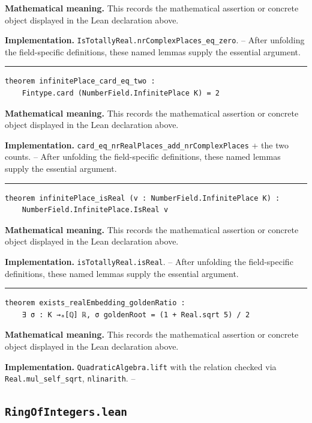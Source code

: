 \documentclass[UTF8,a4paper,11pt,fontset=fandol]{ctexart}
\theoremstyle{definition}
\newcommand{\statementsep}{\par\medskip\hrule\medskip}
\begin{document}
\noindent\textbf{Mathematical meaning.} This records the mathematical assertion or concrete object displayed in the Lean declaration above.\par
\noindent\textbf{Implementation.} \texttt{IsTotallyReal.\allowbreak{}nrComplexPlaces\_\allowbreak{}eq\_\allowbreak{}zero}. -- After unfolding the field-specific definitions, these named lemmas supply the essential argument.\par
\statementsep
\begin{verbatim}
theorem infinitePlace_card_eq_two :
    Fintype.card (NumberField.InfinitePlace K) = 2
\end{verbatim}
\noindent\textbf{Mathematical meaning.} This records the mathematical assertion or concrete object displayed in the Lean declaration above.\par
\noindent\textbf{Implementation.} \texttt{card\_\allowbreak{}eq\_\allowbreak{}nrRealPlaces\_\allowbreak{}add\_\allowbreak{}nrComplexPlaces} + the two counts. -- After unfolding the field-specific definitions, these named lemmas supply the essential argument.\par
\statementsep
\begin{verbatim}
theorem infinitePlace_isReal (v : NumberField.InfinitePlace K) :
    NumberField.InfinitePlace.IsReal v
\end{verbatim}
\noindent\textbf{Mathematical meaning.} This records the mathematical assertion or concrete object displayed in the Lean declaration above.\par
\noindent\textbf{Implementation.} \texttt{isTotallyReal.\allowbreak{}isReal}. -- After unfolding the field-specific definitions, these named lemmas supply the essential argument.\par
\statementsep
\begin{verbatim}
theorem exists_realEmbedding_goldenRatio :
    ∃ σ : K →ₐ[ℚ] ℝ, σ goldenRoot = (1 + Real.sqrt 5) / 2
\end{verbatim}
\noindent\textbf{Mathematical meaning.} This records the mathematical assertion or concrete object displayed in the Lean declaration above.\par
\noindent\textbf{Implementation.} \texttt{QuadraticAlgebra.\allowbreak{}lift} with the relation checked via \texttt{Real.\allowbreak{}mul\_\allowbreak{}self\_\allowbreak{}sqrt}, \texttt{nlinarith}. --\par

\subsection{\texttt{RingOfIntegers.lean}}
\end{document}
